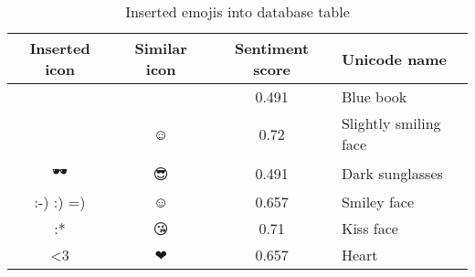 \begin{table}[H]
\centering
\onehalfspacing

\begin{tabularx}{0.95\textwidth}{ c | c | c | X }
	\hline
	\textbf{Inserted icon} & \textbf{Similar icon} & \textbf{Sentiment score} & \textbf{Unicode name} \\  
 	\hline
	📘        & 📗 & 0.491 & Blue book \\
	🙂        &  ☺ & 0.72 & Slightly smiling face \\
	🕶        & 😎 & 0.491 & Dark sunglasses \\
	:-) :) =) &  ☺ & 0.657 & Smiley face \\
	:*        & 😘 & 0.71 & Kiss face \\
	<3        & ❤  &  0.657 & Heart  \\
	\hline
\end{tabularx}

\caption{Inserted emojis into  database table}
\label{tab:inserted-emoticons}

\end{table}